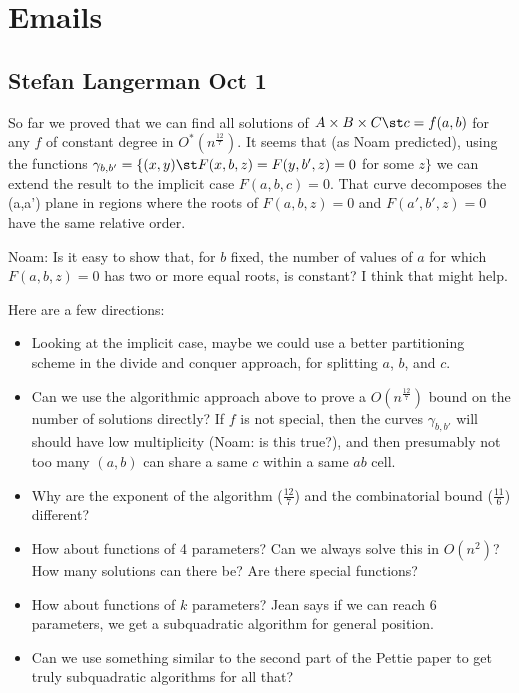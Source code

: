 \section{Emails}

\subsection{Stefan Langerman Oct 1}

So far we proved that we can find all solutions of
\(A\times B\times C \st c = f(a,b)\) for any $f$ of constant degree in
\(O^*(n^\frac{12}{7})\).
It seems that (as Noam predicted), using the functions
\(\gamma_{b,b'} = \{(x,y)\st F(x,b,z)=F(y,b',z)=0\) for some \(z\}\)
we can extend the result to the implicit case $F(a,b,c)=0$.
That curve decomposes the (a,a') plane in regions where the roots of
\(F(a,b,z)=0\) and \(F(a',b',z)=0\) have the same relative order.

Noam: Is it easy to show that, for \(b\) fixed, the number of values of $a$
for which \(F(a,b,z)=0\) has two  or more equal roots, is constant? I
think that might help.

Here are a few directions:
\begin{itemize}
	\item Looking at the implicit case, maybe we could use a better
		partitioning scheme in the divide and conquer approach, for splitting
		$a$, $b$, and $c$.
	\item Can we use the algorithmic approach above to prove a \(O(n^\frac{12}{7})\) bound
		on the number of solutions directly? If $f$ is not special, then the
		curves \(\gamma_{b,b'}\) will should have low multiplicity (Noam: is this
		true?), and then presumably not too many $(a,b)$ can share a same $c$
		within a same $ab$ cell.
	\item Why are the exponent of the algorithm ($\frac{12}{7}$) and the combinatorial
		bound ($\frac{11}{6}$) different?
	\item How about functions of 4 parameters? Can we always solve this in
		\(O(n^2)\)? How many solutions can there be? Are there special functions?
	\item How about functions of $k$ parameters? Jean says if we can reach 6
		parameters, we get a subquadratic algorithm for general position.
	\item Can we use something similar to the second part of the Pettie paper
		to get truly subquadratic algorithms for all that?
\end{itemize}


